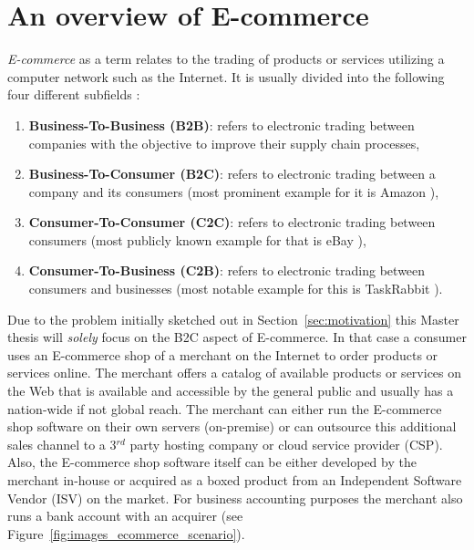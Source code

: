 
\section{An overview of \gls{E-commerce}}
\label{sec:e_commerce_scenario}

\emph{\gls{E-commerce}} as a term relates to the trading of products or services utilizing a computer network such as the Internet. It is usually divided into the following four different subfields \citep{sen2015study}:\@

\begin{enumerate}
  \item \textbf{Business-To-Business (\gls{B2B})}: refers to electronic trading between companies with the objective to improve their supply chain processes,
  \item \textbf{Business-To-Consumer (\gls{B2C})}: refers to electronic trading between a company and its consumers (most prominent example for it is Amazon \citep{Amazon.com}),
  \item \textbf{Consumer-To-Consumer (\gls{C2C})}: refers to electronic trading between consumers (most publicly known example for that is eBay \citep{eBayInc}),
  \item \textbf{Consumer-To-Business (\gls{C2B})}: refers to electronic trading between consumers and businesses (most notable example for this is TaskRabbit \citep{TaskRabbit}).
\end{enumerate}

Due to the problem initially sketched out in Section~\ref{sec:motivation} this Master thesis will \emph{solely} focus on the \gls{B2C} aspect of \gls{E-commerce}. In that case a consumer uses an \gls{E-commerce} shop of a merchant on the Internet to order products or services online. The merchant offers a catalog of available products or services on the Web that is available and accessible by the general public and usually has a nation-wide if not global reach. The merchant can either run the \gls{E-commerce} shop software on their own servers (on-premise) or can outsource this additional sales channel to a 3$^{rd}$ party hosting company or cloud service provider (\gls{CSP}). Also, the \gls{E-commerce} shop software itself can be either developed by the merchant in-house or acquired as a boxed product from an Independent Software Vendor (\gls{ISV}) on the market. For business accounting purposes the merchant also runs a bank account with an acquirer (see Figure~\ref{fig:images_ecommerce_scenario}). \\

